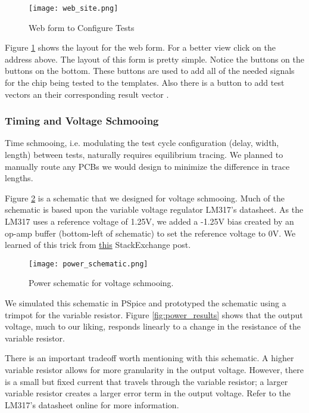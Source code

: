 \begin{figure}[!h]
\texttt{[image: web\_site.png]}
\caption{Web form to Configure Tests}
\label{fig:web_form}
\end{figure}

Figure \ref{fig:web_form} shows the layout for the web form. For a better view click on the address above. The layout of this form is pretty simple. Notice the buttons on the buttons on the bottom. These buttons are used to add all of the needed signals for the chip being tested to the templates. Also there is a button to add test vectors an their corresponding result vector .


\subsubsection{Timing and Voltage Schmooing}
Time schmooing, i.e. modulating the test cycle configuration (delay, width, length) between tests, naturally requires equilibrium tracing. We planned to manually route any PCBs we would design to minimize the difference in trace lengths.

Figure \ref{fig:power_schematic} is a schematic that we designed for voltage schmooing. Much of the schematic is based upon the variable voltage regulator LM317's datasheet. As the LM317 uses a reference voltage of 1.25V, we added a -1.25V bias created by an op-amp buffer (bottom-left of schematic) to set the reference voltage to 0V. We learned of this trick from  \href{http://electronics.stackexchange.com/questions/186760/why-do-linear-voltage-regulators-have-minimum-output-voltage-0-v}{this} StackExchange post. 

\begin{figure}[!h]
\texttt{[image: power\_schematic.png]}
\caption{Power schematic for voltage schmooing.}
\label{fig:power_schematic}
\end{figure}

We simulated this schematic in PSpice and prototyped the schematic using a trimpot for the variable resistor. Figure \ref{fig:power_results} shows that the output voltage, much to our liking, responds linearly to a change in the resistance of the variable resistor.

There is an important tradeoff worth mentioning with this schematic. A higher variable resistor allows for more granularity in the output voltage. However, there is a small but fixed current that travels through the variable resistor; a larger variable resistor creates a larger error term in the output voltage. Refer to the LM317's datasheet online for more information.

